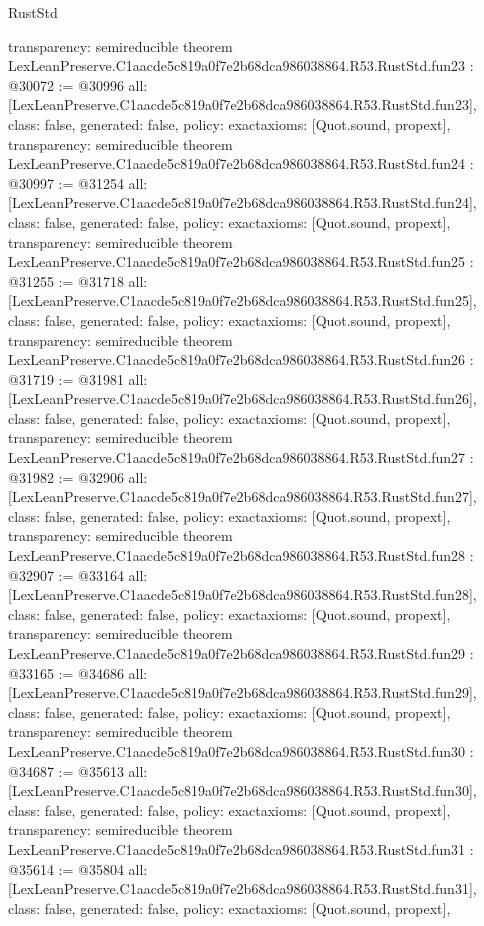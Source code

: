 \begin{lexlean}{RustStd}
\begin{coremodule}
{  transparency: semireducible
}
theorem LexLeanPreserve.C1aacde5c819a0f7e2b68dca986038864.R53.RustStd.fun23 : @30072 := @30996 {
  all: [LexLeanPreserve.C1aacde5c819a0f7e2b68dca986038864.R53.RustStd.fun23],
  class: false,
  generated: false,
  policy: exact{axioms: [Quot.sound, propext]},
  transparency: semireducible
}
theorem LexLeanPreserve.C1aacde5c819a0f7e2b68dca986038864.R53.RustStd.fun24 : @30997 := @31254 {
  all: [LexLeanPreserve.C1aacde5c819a0f7e2b68dca986038864.R53.RustStd.fun24],
  class: false,
  generated: false,
  policy: exact{axioms: [Quot.sound, propext]},
  transparency: semireducible
}
theorem LexLeanPreserve.C1aacde5c819a0f7e2b68dca986038864.R53.RustStd.fun25 : @31255 := @31718 {
  all: [LexLeanPreserve.C1aacde5c819a0f7e2b68dca986038864.R53.RustStd.fun25],
  class: false,
  generated: false,
  policy: exact{axioms: [Quot.sound, propext]},
  transparency: semireducible
}
theorem LexLeanPreserve.C1aacde5c819a0f7e2b68dca986038864.R53.RustStd.fun26 : @31719 := @31981 {
  all: [LexLeanPreserve.C1aacde5c819a0f7e2b68dca986038864.R53.RustStd.fun26],
  class: false,
  generated: false,
  policy: exact{axioms: [Quot.sound, propext]},
  transparency: semireducible
}
theorem LexLeanPreserve.C1aacde5c819a0f7e2b68dca986038864.R53.RustStd.fun27 : @31982 := @32906 {
  all: [LexLeanPreserve.C1aacde5c819a0f7e2b68dca986038864.R53.RustStd.fun27],
  class: false,
  generated: false,
  policy: exact{axioms: [Quot.sound, propext]},
  transparency: semireducible
}
theorem LexLeanPreserve.C1aacde5c819a0f7e2b68dca986038864.R53.RustStd.fun28 : @32907 := @33164 {
  all: [LexLeanPreserve.C1aacde5c819a0f7e2b68dca986038864.R53.RustStd.fun28],
  class: false,
  generated: false,
  policy: exact{axioms: [Quot.sound, propext]},
  transparency: semireducible
}
theorem LexLeanPreserve.C1aacde5c819a0f7e2b68dca986038864.R53.RustStd.fun29 : @33165 := @34686 {
  all: [LexLeanPreserve.C1aacde5c819a0f7e2b68dca986038864.R53.RustStd.fun29],
  class: false,
  generated: false,
  policy: exact{axioms: [Quot.sound, propext]},
  transparency: semireducible
}
theorem LexLeanPreserve.C1aacde5c819a0f7e2b68dca986038864.R53.RustStd.fun30 : @34687 := @35613 {
  all: [LexLeanPreserve.C1aacde5c819a0f7e2b68dca986038864.R53.RustStd.fun30],
  class: false,
  generated: false,
  policy: exact{axioms: [Quot.sound, propext]},
  transparency: semireducible
}
theorem LexLeanPreserve.C1aacde5c819a0f7e2b68dca986038864.R53.RustStd.fun31 : @35614 := @35804 {
  all: [LexLeanPreserve.C1aacde5c819a0f7e2b68dca986038864.R53.RustStd.fun31],
  class: false,
  generated: false,
  policy: exact{axioms: [Quot.sound, propext]},
}
\end{coremodule}
\end{lexlean}
